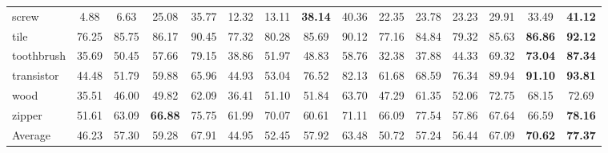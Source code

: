 \documentclass[letterpaper]{article} %
\begin{document}
\begin{table*}[htbp]
{\begin{tabular}{l|cc|cc|cc|cc|cc|cc|cc}
screw & 4.88  & 6.63  & 25.08 & 35.77 &  12.32 & 13.11  &\textbf{38.14} & {40.36} & 22.35 & 23.78 & 23.23 & 29.91 & 33.49 &\textbf{41.12} \\
tile & 76.25 & 85.75 & 86.17 & 90.45 &  77.32 & 80.28  & 85.69 & 90.12 & 77.16 & 84.84 & 79.32 & 85.63 &\textbf{86.86} &\textbf{92.12} \\
toothbrush & 35.69 & 50.45 & 57.66 & 79.15 &  38.86 & 51.97  & 48.83 & 58.76 & 32.38 & 37.88 & 44.33 & 69.32 &\textbf{73.04} &\textbf{87.34} \\
transistor & 44.48 & 51.79 & 59.88 & 65.96 &  44.93 & 53.04  & 76.52 & 82.13 & 61.68 & 68.59 & 76.34 & {89.94} &\textbf{91.10} &\textbf{93.81} \\
wood & 35.51 & 46.00 & 49.82 & 62.09 &  36.41 & 51.10  & 51.84 & 63.70 & 47.29 & 61.35 & 52.06 & 72.75 & 68.15 & 72.69\\
zipper & 51.61 & 63.09 &\textbf{66.88} & 75.75 &   61.99 & 70.07   & 60.61 & 71.11 & 66.09 & 77.54 & 57.86 & 67.64 & 66.59 &\textbf{78.16} \\ \hline
Average 
& 46.23 & 57.30 
& 59.28 & 67.91 
& 44.95 & 52.45 
& 57.92 & 63.48 
& 50.72 & 57.24 
& 56.44 & 67.09 
&\textbf{70.62} &\textbf{77.37} \\ \hline

\end{tabular}
}
\vskip 0.1in
\label{mvtec_bise}
\end{table*}
\end{document}
